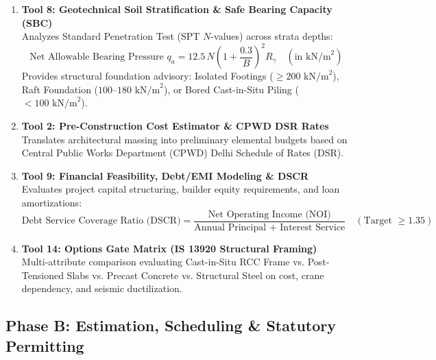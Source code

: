 \documentclass[11pt,a4paper]{article}
\begin{document}
\begin{enumerate}[leftmargin=*]
    \item \textbf{Tool 8: Geotechnical Soil Stratification \& Safe Bearing Capacity (SBC)} \\
    Analyzes Standard Penetration Test (SPT $N$-values) across strata depths:
    \begin{equation}
        \text{Net Allowable Bearing Pressure } q_a = 12.5\, N \left(1 + \frac{0.3}{B}\right)^2 R_\gamma \quad (\text{in kN/m}^2)
    \end{equation}
    Provides structural foundation advisory: Isolated Footings ($\ge 200\text{ kN/m}^2$), Raft Foundation ($100$--$180\text{ kN/m}^2$), or Bored Cast-in-Situ Piling ($< 100\text{ kN/m}^2$).

    \item \textbf{Tool 2: Pre-Construction Cost Estimator \& CPWD DSR Rates} \\
    Translates architectural massing into preliminary elemental budgets based on Central Public Works Department (CPWD) Delhi Schedule of Rates (DSR).

    \item \textbf{Tool 9: Financial Feasibility, Debt/EMI Modeling \& DSCR} \\
    Evaluates project capital structuring, builder equity requirements, and loan amortizations:
    \begin{equation}
        \text{Debt Service Coverage Ratio (DSCR)} = \frac{\text{Net Operating Income (NOI)}}{\text{Annual Principal + Interest Service}} \quad (\text{Target } \ge 1.35)
    \end{equation}

    \item \textbf{Tool 14: Options Gate Matrix (IS 13920 Structural Framing)} \\
    Multi-attribute comparison evaluating Cast-in-Situ RCC Frame vs. Post-Tensioned Slabs vs. Precast Concrete vs. Structural Steel on cost, crane dependency, and seismic ductilization.
\end{enumerate}

\subsection{Phase B: Estimation, Scheduling \& Statutory Permitting}
\end{document}
